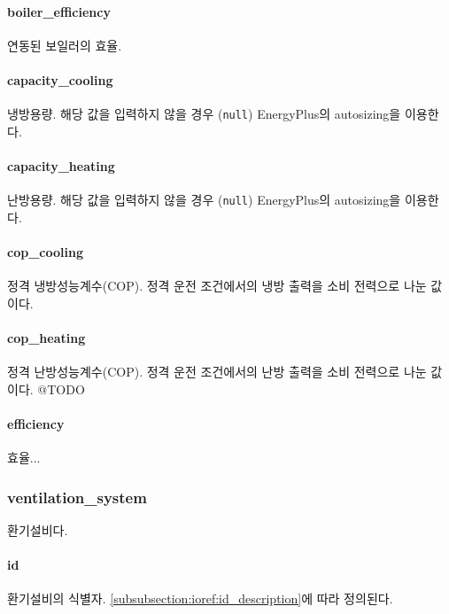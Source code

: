 \paragraph{boiler\_efficiency} 연동된 보일러의 효율.

\paragraph{capacity\_cooling} 냉방용량. 해당 값을 입력하지 않을 경우 (\texttt{null}) EnergyPlus의 autosizing을 이용한다.

\paragraph{capacity\_heating} 난방용량. 해당 값을 입력하지 않을 경우 (\texttt{null}) EnergyPlus의 autosizing을 이용한다.

\paragraph{cop\_cooling} 정격 냉방성능계수(COP). 정격 운전 조건에서의 냉방 출력을 소비 전력으로 나눈 값이다.

\paragraph{cop\_heating} 정격 난방성능계수(COP). 정격 운전 조건에서의 난방 출력을 소비 전력으로 나눈 값이다.
@TODO
\paragraph{efficiency} 효율...

\subsubsection{ventilation\_system} \label{subsubsection:ioref:ventilationsystem}
환기설비다.


\paragraph{id} 환기설비의 식별자. \ref{subsubsection:ioref:id_description}에 따라 정의된다.


